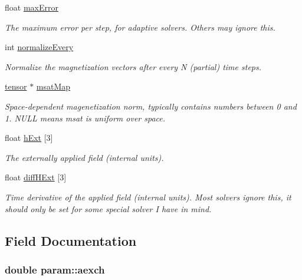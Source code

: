 \begin{DoxyCompactItemize}
float \hyperlink{structparam_a2a8499acbeddc6e61a98595844265a16}{maxError}
\begin{DoxyCompactList}\small\item\em The maximum error per step, for adaptive solvers. Others may ignore this. \item\end{DoxyCompactList}\item 
int \hyperlink{structparam_ad56d2bfef6493e73e56a3230a55ff3b6}{normalizeEvery}
\begin{DoxyCompactList}\small\item\em Normalize the magnetization vectors after every N (partial) time steps. \item\end{DoxyCompactList}\item 
\hyperlink{structtensor}{tensor} $\ast$ \hyperlink{structparam_ac7dc8dd010a87db979e836357390dbc9}{msatMap}
\begin{DoxyCompactList}\small\item\em Space-\/dependent magenetization norm, typically contains numbers between 0 and 1. NULL means msat is uniform over space. \item\end{DoxyCompactList}\item 
float \hyperlink{structparam_a45391a3b3e3f3515e32a9f9020f65316}{hExt} \mbox{[}3\mbox{]}
\begin{DoxyCompactList}\small\item\em The externally applied field (internal units). \item\end{DoxyCompactList}\item 
float \hyperlink{structparam_a622d7704eddc40f2cddc2cd7dfa5f235}{diffHExt} \mbox{[}3\mbox{]}
\begin{DoxyCompactList}\small\item\em Time derivative of the applied field (internal units). Most solvers ignore this, it should only be set for some special solver I have in mind. \item\end{DoxyCompactList}\end{DoxyCompactItemize}


\subsection{Field Documentation}
\hypertarget{structparam_aa76816b3e378b7c178bcd415bf0aaa45}{
\subsubsection[{aexch}]{\setlength{\rightskip}{0pt plus 5cm}double {\bf param::aexch}}}
\label{structparam_aa76816b3e378b7c178bcd415bf0aaa45}


